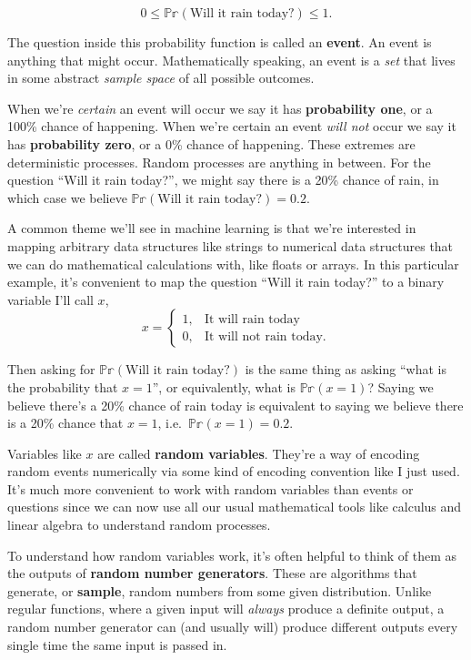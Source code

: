 \documentclass[
  letterpaper,
  DIV=11,
  numbers=noendperiod]{scrreprt}
\begin{document}
\[0 \leq \mathbb{Pr}(\text{Will it rain today?}) \leq 1.\]

The question inside this probability function is called an
\textbf{event}. An event is anything that might occur. Mathematically
speaking, an event is a \emph{set} that lives in some abstract
\emph{sample space} of all possible outcomes.

When we're \emph{certain} an event will occur we say it has
\textbf{probability one}, or a 100\% chance of happening. When we're
certain an event \emph{will not} occur we say it has \textbf{probability
zero}, or a 0\% chance of happening. These extremes are deterministic
processes. Random processes are anything in between. For the question
``Will it rain today?'', we might say there is a 20\% chance of rain, in
which case we believe \(\mathbb{Pr}(\text{Will it rain today?}) = 0.2\).

A common theme we'll see in machine learning is that we're interested in
mapping arbitrary data structures like strings to numerical data
structures that we can do mathematical calculations with, like floats or
arrays. In this particular example, it's convenient to map the question
``Will it rain today?'' to a binary variable I'll call \(x\), \[
x = 
\begin{cases}
1, & \text{It will rain today} \\
0, & \text{It will not rain today}.
\end{cases}
\]

Then asking for \(\mathbb{Pr}(\text{Will it rain today?})\) is the same
thing as asking ``what is the probability that \(x=1\)'', or
equivalently, what is \(\mathbb{Pr}(x=1)\)? Saying we believe there's a
20\% chance of rain today is equivalent to saying we believe there is a
20\% chance that \(x=1\), i.e.~\(\mathbb{Pr}(x=1)=0.2\).

Variables like \(x\) are called \textbf{random variables}. They're a way
of encoding random events numerically via some kind of encoding
convention like I just used. It's much more convenient to work with
random variables than events or questions since we can now use all our
usual mathematical tools like calculus and linear algebra to understand
random processes.

To understand how random variables work, it's often helpful to think of
them as the outputs of \textbf{random number generators}. These are
algorithms that generate, or \textbf{sample}, random numbers from some
given distribution. Unlike regular functions, where a given input will
\emph{always} produce a definite output, a random number generator can
(and usually will) produce different outputs every single time the same
input is passed in.
\end{document}
